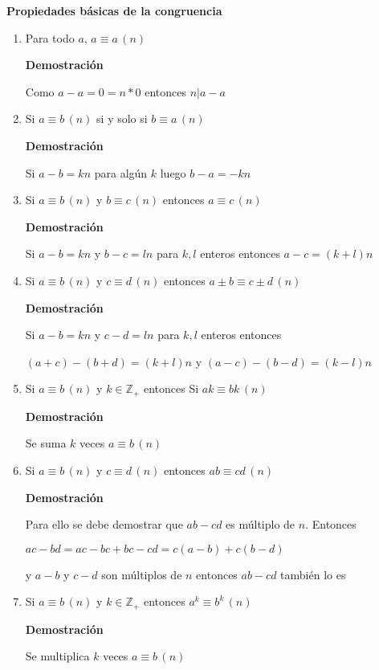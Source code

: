 \documentclass[a4paper,12pt]{report}
\begin{document}
\textbf{Propiedades básicas de la congruencia}
\begin{enumerate}
 \item Para todo $a$, $a \equiv a \, (n)$
 
 \textbf{Demostración}
 
 Como $a-a = 0 = n*0$ entonces $n|a-a$
 
 \item Si $a \equiv b \, (n)$ si y solo si $b \equiv a \, (n)$
 
 \textbf{Demostración}
 
 Si $a-b=kn$ para algún $k$ luego $b-a=-kn$
 
 \item Si $a \equiv b \, (n)$ y $b \equiv c \, (n)$ entonces $a \equiv c \, (n)$
 
 \textbf{Demostración}
 
 Si $a-b=kn$ y $b-c=ln$ para $k,l$ enteros entonces $a-c=(k+l)n$
 
 \item Si $a \equiv b \, (n)$ y $c \equiv d \, (n)$ entonces $a\pm b \equiv c\pm d \, (n)$
 
 \textbf{Demostración}
 
 Si $a-b=kn$ y $c-d=ln$ para $k,l$ enteros entonces 
 
 $(a+c)-(b+d)=(k+l)n$ y $(a-c)-(b-d)=(k-l)n$
 
 \item Si $a \equiv b \, (n)$ y $k\in\mathbb{Z}_+$ entonces Si $ak \equiv bk \, (n)$
 
 \textbf{Demostración}
 
 Se suma $k$ veces $a \equiv b \, (n)$
 
 \item Si $a \equiv b \, (n)$ y $c \equiv d \, (n)$ entonces $ab \equiv cd \, (n)$
 
 \textbf{Demostración}
 
 Para ello se debe demostrar que $ab - cd$ es múltiplo de $n$. Entonces 
 
 $ac - bd = ac - bc + bc - cd = c(a-b) + c(b-d)$
 
 y $a-b$ y $c-d$ son múltiplos de $n$ entonces $ab - cd$ también lo es
 
 
 \item Si $a \equiv b \, (n)$ y $k\in\mathbb{Z}_+$ entonces $a^k \equiv b^k \, (n)$
 
  \textbf{Demostración}
 
 Se multiplica $k$ veces $a \equiv b \, (n)$
 

\end{enumerate}
\end{document}
